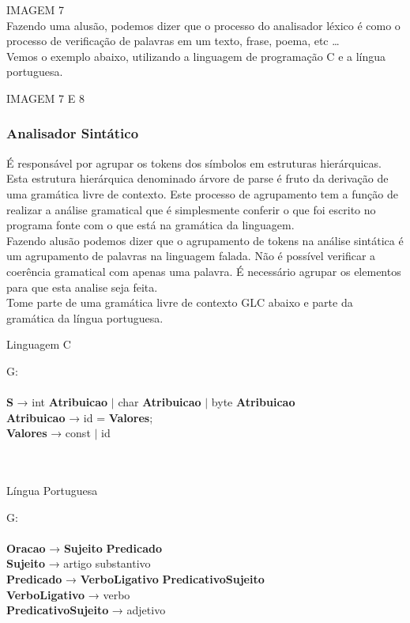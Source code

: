 IMAGEM 7\\

Fazendo uma alusão, podemos dizer que o processo do analisador léxico é como o processo de verificação de palavras em um texto, frase, poema, etc …\\

Vemos o exemplo abaixo, utilizando a linguagem de programação C e a língua portuguesa.


IMAGEM 7 E 8\\

\subsubsection{Analisador Sintático} 
É responsável por agrupar os tokens dos símbolos em estruturas hierárquicas. \\ 

Esta estrutura hierárquica denominado árvore de parse é fruto da derivação de uma gramática livre de contexto. Este processo de agrupamento tem a função de realizar a análise gramatical que é simplesmente conferir o que foi escrito no programa fonte com o que está na gramática da linguagem. \\

Fazendo alusão podemos dizer que o agrupamento de tokens na análise sintática é um agrupamento de palavras na linguagem falada. Não é possível verificar a coerência gramatical com apenas uma palavra. É necessário agrupar os elementos para que esta analise seja feita. \\

Tome parte de uma gramática livre de contexto GLC abaixo e parte da gramática da língua portuguesa. \\

\begin{center}
Linguagem C
\end{center}

G:\\ \\
\textbf{S} → int \textbf{Atribuicao} $|$ char \textbf{Atribuicao} $|$ byte \textbf{Atribuicao}\\
\textbf{Atribuicao} → id = \textbf{Valores};\\
\textbf{Valores} → const $|$ id \\ \\ \\

\begin{center}
Língua Portuguesa
\end{center}

G:\\ \\
\textbf{Oracao} → \textbf{Sujeito} \textbf{Predicado} \\
\textbf{Sujeito} → artigo substantivo \\
\textbf{Predicado} → \textbf{VerboLigativo} \textbf{PredicativoSujeito} \\
\textbf{VerboLigativo} → verbo \\
\textbf{PredicativoSujeito} → adjetivo
